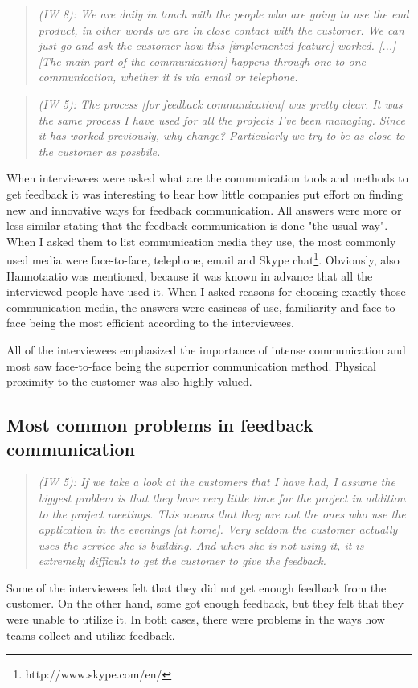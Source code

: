 \documentclass[english,12pt,a4paper,pdftex]{article}
\newcommand{\q}[2]{
\begin{quote}
\emph{(IW #1): #2}
\end{quote}}
\begin{document}
\q{8}{We are daily in touch with the people who are going to use the end product, in other words we are in close contact with the customer. We can just go and ask the customer how this [implemented feature] worked. [...] [The main part of the communication] happens through one-to-one communication, whether it is via email or telephone.}

\q{5}{The process [for feedback communication] was pretty clear. It was the same process I have used for all the projects I've been managing. Since it has worked previously, why change? Particularly we try to be as close to the customer as possbile.}

When interviewees were asked what are the communication tools and methods to get feedback it was interesting to hear how little companies put effort on finding new and innovative ways for feedback communication. All answers were more or less similar stating that the feedback communication is done "the usual way". When I asked them to list communication media they use, the most commonly used media were face-to-face, telephone, email and Skype chat\footnote{http://www.skype.com/en/}. Obviously, also Hannotaatio was mentioned, because it was known in advance that all the interviewed people have used it. When I asked reasons for choosing exactly those communication media, the answers were easiness of use, familiarity and face-to-face being the most efficient according to the interviewees. 

All of the interviewees emphasized the importance of intense communication and most saw face-to-face being the superrior communication method. Physical proximity to the customer was also highly valued.

\subsection{Most common problems in feedback communication}

\q{5}{If we take a look at the customers that I have had, I assume the biggest problem is that they have very little time for the project in addition to the project meetings. This means that they are not the ones who use the application in the evenings [at home]. Very seldom the customer actually uses the service she is building. And when she is not using it, it is extremely difficult to get the customer to give the feedback.}

Some of the interviewees felt that they did not get enough feedback from the customer. On the other hand, some got enough feedback, but they felt that they were unable to utilize it. In both cases, there were problems in the ways how teams collect and utilize feedback.
\end{document}
